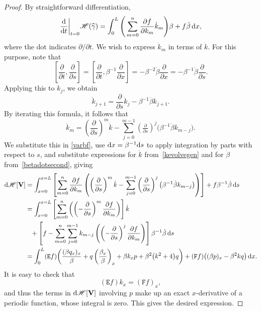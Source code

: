 \documentclass[10pt,a4paper]{amsart}
\def\Fop{\mathtt F} %
\def\Euler{\mathtt E}
\newcommand\kk{k} %
\newcommand\speed{\beta} %
\newcommand\VV{\mathbf V}
\newcommand\funH{{\mathscr H}} %
\newcommand{\dx}{\,{\rm d}x}
\newcommand{\ds}{\,{\rm d}s}
\def\gam{\gamma} %
\def\di{\partial}
\newcommand\gamf{\widehat{\gam}} %
\numberwithin{equation}{section}
\begin{document}
\begin{proof}
By straightforward differentiation,
\begin{equation}\label{varbf}
\dfrac{{\rm d}}{{\rm d}t}\bigg|_{t=0} \funH(\gamf)
=\int_0^L \Bigg(\sum_{m=0}^n \dfrac{\di f}{\di \kk_m} \dot\kk_m\Bigg) \speed + f \dot{\speed} \dx,
\end{equation}
where the dot indicates $\di/\di t$.
We wish to express $\dot\kk_m$ in terms of $\dot\kk$. For this purpose, note that
\[\left[\frac{\di}{\di t}, \frac{\di}{\di s}\right] = \left[\frac{\di}{\di t}, \speed^{-1} \frac{\di}{\di x}\right] =
-\speed^{-2} \dot\speed \frac{\di }{\di x} = -\speed^{-1} \dot\speed \frac{\di }{\di s}.\]
Applying this to $\kk_j$, we obtain
\[\dot\kk_{j+1} = \frac{\di}{\di s} \dot\kk_j -\speed^{-1} \dot\speed \kk_{j+1}.\]
By iterating this formula, it follows that
\[\dot\kk_m = \left(\frac{\di}{\di s}\right)^m \dot \kk - \sum_{j=0}^{m-1} \left(\tfrac{\di}{\di s}\right)^j \bigl( \speed^{-1} \dot\speed \kk_{m-j}\bigr).\]
We substitute this in \eqref{varbf}, use ${\rm d}x=\speed^{-1} {\rm d}s$ to apply integration by parts with respect to $s$, and substitute expressions for $\dot{k}$ from~\eqref{kevolvegen} and for $\dot{\beta}$ from~\eqref{betadotsecond}, giving
\begin{align*}
{\rm d}\funH[\VV] &= \int_{x=0}^{x=L} \left[\sum_{m=0}^n \dfrac{\di f}{\di \kk_m}
\left(\left(\frac{\di}{\di s}\right)^m \dot \kk - \sum_{j=0}^{m-1} \left(\frac{\di}{\di s}\right)^j \bigl( \speed^{-1} \dot\speed \kk_{m-j}\bigr)\right)\right] + f \speed^{-1} \dot\speed \ds \\
&= \int_{x=0}^{x=L} \left[ \sum_{m=0}^n \left( \left(-\frac{\di}{\di s}\right)^m \dfrac{\di f}{\di \kk_m} \right) \right] \dot \kk \\
&\hphantom{=} + \left[ f - \sum_{m=0}^n \sum_{j=0}^{m-1} \kk_{m-j} \left(\left(-\frac{\di}{\di s}\right)^j \dfrac{\di f}{\di \kk_m}\right) \right] \speed^{-1} \dot\speed \ds
\\
&= \int_{0}^{L} (\Euler f)\biggl( \dfrac{(\speed q_x)_x}{\speed}
+ q\left( \dfrac{\speed_x}{\speed}\right)_x
+ \speed \kk_x p + \speed^2\bigl(\kk^2 + 4\bigr) q\biggr) + (\Fop f) \bigl( (\speed p)_x - \speed^2 k q\bigr) \dx.
\end{align*}
It is easy to check that
\begin{equation}\label{Eulerfident}
(\Euler f) k_x = (\Fop f)_x,
\end{equation}
and thus the terms in ${\rm d}\funH[\VV]$ involving $p$ make up an exact $x$-derivative of a periodic function, whose integral is zero. This gives the desired expression.
\end{proof}
\end{document}
